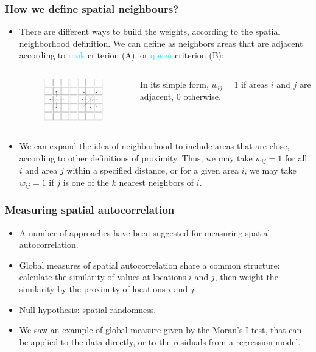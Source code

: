 \documentclass[12pt]{beamer}
\begin{document}
\begin{frame}
\frametitle{How we define spatial neighbours?}
\begin{itemize} \setlength\itemsep{\fill}
\item \small{There are different ways to build the weights, according to the spatial neighborhood definition. We can define as neighbors areas that are  adjacent according to \textcolor{cyan}{rook} criterion (A), or \textcolor{cyan}{queen} criterion (B):}
\begin{columns}
\begin{figure}
  \includegraphics[width=1.5in]{Weights.jpg}
\end{figure}
\small {In its simple form, $w_{ij}=1$ if areas $i$ and $j$ are adjacent, 0 otherwise.}
\end{columns}   
   
\item \small{We can expand the idea of neighborhood to include areas that are close, according to other definitions of proximity. Thus, we may take $w_{ij}=1$ for all $i$ and area $j$ within a specified distance, or for a given area $i$, we may take $w_{ij}=1$ if $j$ is one of the $k$ nearest neighbors of $i$.}
\end{itemize}
\end{frame}


\begin{frame}
\frametitle{Measuring spatial autocorrelation}
\begin{itemize}\setlength\itemsep{\fill}
\item A number of approaches have been suggested for measuring spatial autocorrelation.
\item Global measures of spatial autocorrelation share a common structure: calculate the similarity of values at locations $i$ and $j$, then weight the similarity by the proximity of locations $i$ and $j$.
\item Null hypothesis: spatial randomness. 
\item We saw an example of global measure given by the Moran's I test, that can be applied to the data directly, or to the residuals from a regression model.
\end{itemize}
\end{frame}
\end{document}
